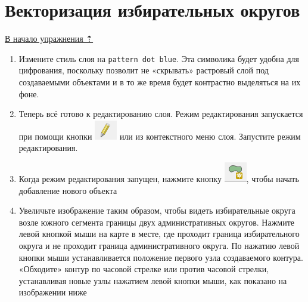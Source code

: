 \documentclass[
  12pt,
]{book}
\begin{document}
\hypertarget{digitizing-drawing}{%
\section{Векторизация избирательных округов}\label{digitizing-drawing}}

\protect\hyperlink{digitizingf-districts}{В начало упражнения ⇡}

\begin{enumerate}
\def\labelenumi{\arabic{enumi}.}
\item
  Измените стиль слоя на \texttt{pattern\ dot\ blue}. Эта символика будет удобна для цифрования, поскольку позволит не «скрывать» растровый слой под создаваемыми объектами и в то же время будет контрастно выделяться на их фоне.
\item
  Теперь всё готово к редактированию слоя. Режим редактирования запускается при помощи кнопки \includegraphics{images/Ex05_Vectorization/button_editing.png} или из контекстного меню слоя. Запустите режим редактирования.
\item
  Когда режим редактирования запущен, нажмите кнопку \includegraphics{images/Ex05_Vectorization/button_new.png}, чтобы начать добавление нового объекта
\item
  Увеличьте изображение таким образом, чтобы видеть избирательные округа возле южного сегмента границы двух административных округов. Нажмите левой кнопкой мыши на карте в месте, где проходит граница избирательного округа и не проходит граница административного округа. По нажатию левой кнопки мыши устанавливается положение первого узла создаваемого контура. «Обходите» контур по часовой стрелке или против часовой стрелки, устанавливая новые узлы нажатием левой кнопки мыши, как показано на изображении ниже
\end{enumerate}
\end{document}
